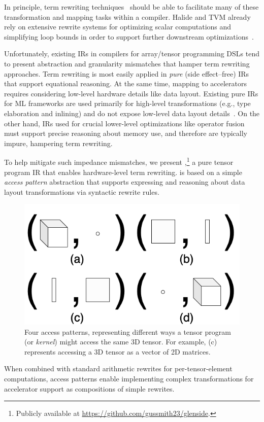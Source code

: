 In principle, term rewriting techniques~\cite{baader1998term}
  should be able to facilitate many of
  these transformation and mapping tasks
  within a compiler.
Halide and TVM already rely
  on extensive rewrite systems for
  optimizing scalar computations and
  simplifying loop bounds in order to
  support further downstream optimizations~\cite{newcomb2020halide-rewrite,
  hagedorn2020func-high-perf}.

Unfortunately, existing IRs in compilers for
  array/tensor programming DSLs tend to
  present abstraction and granularity mismatches
  that hamper term rewriting approaches.
Term rewriting is most easily applied in
  \textit{pure} (side effect--free) IRs
  that support equational reasoning.
At the same time,
  mapping to accelerators requires considering
  low-level hardware details like data layout.
Existing pure IRs for ML frameworks are used
  primarily for high-level transformations
  (e.g., type elaboration and inlining)
  and do not expose low-level data layout details~\cite{relay}.
On the other hand,
  IRs used for crucial lower-level optimizations like
  operator fusion must support
  precise reasoning about memory use,
  and therefore are typically impure,
  hampering term rewriting.%

To help mitigate such impedance mismatches,
  we present \textit{\g},\footnote{Publicly available at \url{https://github.com/gussmith23/glenside}.}
  a pure tensor program IR
  that enables hardware-level term rewriting.
\g is based on a simple
  \textit{access pattern} abstraction that
  supports expressing and reasoning about
  data layout transformations via
  syntactic rewrite rules.
  \begin{figure}
    \centering
    \includegraphics[width=.6\linewidth]{glenside/access-pattern-examples-2x2.png}
    \caption{
      Four access patterns,
        representing different ways
        a
        tensor program
        (or \textit{kernel})
        might access
        the same 3D tensor. 
      For example, (c) represents
        accessing a 3D tensor as
        a vector of 2D matrices.}
    \label{fig:access-pattern-examples}
    \vspace{-1em}
\end{figure}
When combined with standard arithmetic rewrites
  for per-tensor-element computations,
  access patterns enable implementing complex
  transformations for accelerator support as
  compositions of simple rewrites.

